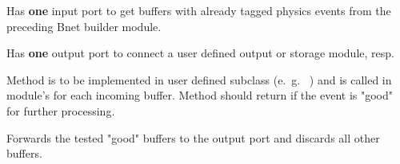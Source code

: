 \begin{description}
\begin{compactenum}
  \item Has {\bf one} input port to get buffers with 
      already tagged physics events from the preceding Bnet builder module.
  \item Has {\bf one} output port to connect a user defined output or storage module, resp.
  \item Method  is to be implemented in user 
      defined subclass (e.~g.~ ) and is called in 
      module's  for each incoming buffer. 
      Method should return  if the event is "good" for further processing.
  \item Forwards the tested "good" buffers to the output 
      port and discards all other buffers.
\end{compactenum}
\end{description}